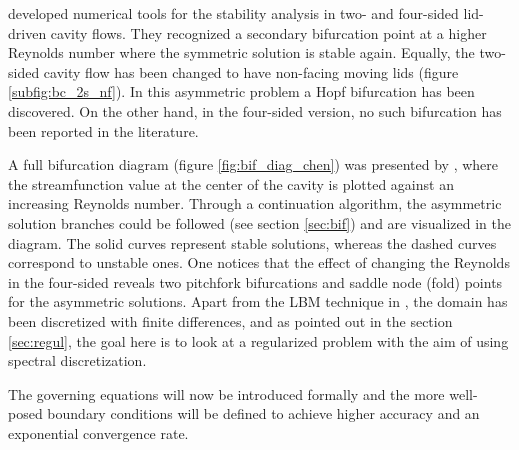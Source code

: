 \cite{cadou2012} developed numerical tools for the stability analysis in two-
and four-sided lid-driven cavity flows. They recognized a secondary bifurcation
point at a higher Reynolds number where the symmetric solution is stable again.
Equally, the two-sided cavity flow has been changed to have non-facing moving
lids (figure \ref{subfig:bc_2s_nf}). In this asymmetric problem a Hopf
bifurcation has been discovered. On the other hand, in the four-sided version,
no such bifurcation has been reported in the literature.

A full bifurcation diagram (figure \ref{fig:bif_diag_chen}) was presented by
\cite{chen2013}, where the streamfunction value at the center of the cavity is
plotted against an increasing Reynolds number. Through a continuation
algorithm, the asymmetric solution branches could be followed (see section
\ref{sec:bif}) and are visualized in the diagram. The solid curves represent
stable solutions, whereas the dashed curves correspond to unstable ones. One
notices that the effect of changing the Reynolds in the four-sided reveals two
pitchfork bifurcations and saddle node (fold) points for the asymmetric
solutions. Apart from the LBM technique in \citet{chen2013}, the domain has
been discretized with finite differences, and as pointed out in the section
\ref{sec:regul}, the goal here is to look at a regularized problem with the aim
of using spectral discretization.

The governing equations will now be introduced formally and the more well-posed
boundary conditions will be defined to achieve higher accuracy and an
exponential convergence rate.
